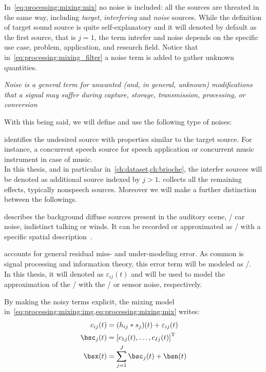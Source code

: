 In~\cref{eq:processing:mixing:mix} no noise is included:
all the sources are threated in the same way, including \textit{target}, \textit{interfering} and \textit{noise} sources.
While the definition of target sound source is quite self-explanatory and it will denoted by default as the first source, that is $j = 1$,
the term interfer and noise depends on the specific use case, problem, application, and research field.
Notice that in~\cref{eq:processing:mixing_filter} a noise term is added to gather unknown quantities.
\begin{center}
    \textit{\emph{Noise} is a general term for unwanted (and, in general, unknown) modifications that a signal may suffer during capture, storage, transmission, processing, or conversion
    }
\end{center}
With this being said, we will define and use the following type of noises:

 identifies the undesired source with properties similar to the target source.
For instance, a concurrent speech source for speech application or concurrent music instrument in case of music.
\\In this thesis, and in particular in~\cref{ch:dataset,ch:brioche}, the interfer sources will be denoted
as additional source indexed by $j > 1$.
 collects all the remaining effects, typically nonspeech sources. Moreover we will make a further distinction between the followings.

 describes the background diffuse sources present in the auditory scene, \eg/ car noise, indistinct talking or winds.
It can be recorded or approximated as \AWGN/ with a specific spatial description~.

 accounts for general residual miss- and under-modeling error.
As common is signal processing and information theory, this error term will be modeled as \AWGN/.
\\In this thesis, it will denoted as $\varepsilon_{ij}( t)$ and will be used to model the
approximation of the \RIR/ with the \ISM/ or sensor noise, respectively.

\mynewline
By making the noisy terms explicit, the mixing model in~\cref{eq:processing:mixing:img,eq:processing:mixing:mix} writes:
\begin{align}
    \img_{\idxMic\idxSrc}(t) &=  \kparen{h_{\idxMic\idxSrc} \conv \src_\idxSrc} (t) +  \varepsilon_{ij}(t)\\
    \imgs_\idxSrc(t)         &= \ktranspose{\klist{\img_{1\idxSrc}(t), \dots, \img_{\numMics\idxSrc}(t)}} \nonumber\\
    \mics(t)                 &= \sum_{\idxSrc=1}^{\numSrcs} \imgs_\idxSrc(t) + \bsn( t)
\end{align}

